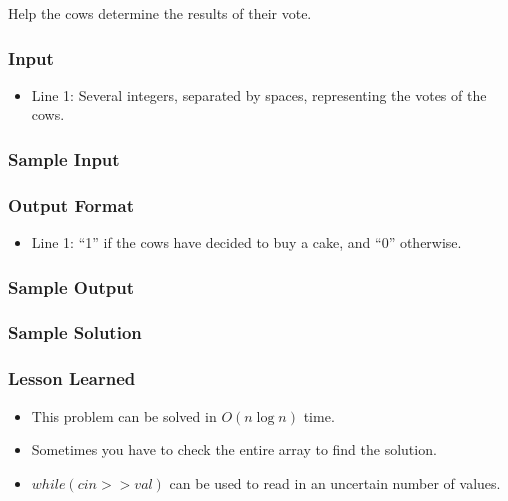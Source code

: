 Help the cows determine the results of their vote.

\subsubsection{Input}
\begin{itemize}
	\item Line 1: Several integers, separated by spaces, representing the votes of the cows.
\end{itemize}

\subsubsection{Sample Input}


\subsubsection{Output Format}
\begin{itemize}
	\item Line 1: ``1'' if the cows have decided to buy a cake, and ``0'' otherwise.
\end{itemize}
\subsubsection{Sample Output}


\subsubsection{Sample Solution}


\subsubsection{Lesson Learned}
\begin{itemize}
	\item This problem can be solved in $O(n \log n)$ time.
	\item Sometimes you have to check the entire array to find the solution.
	\item $while(cin >> val)$ can be used to read in an uncertain number of values.
\end{itemize}
